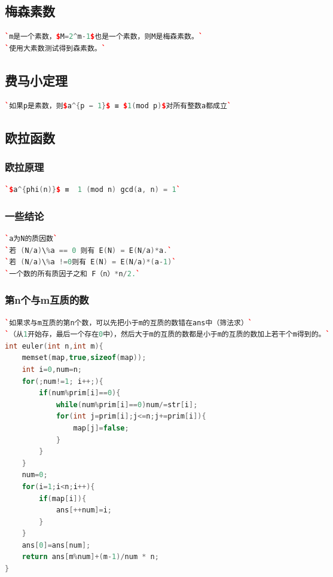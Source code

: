 \documentclass[a4paper]{article}
\begin{document}
\begin{CJK*}{UTF8}{gbsn}
\begin{multicols}{3}
\begin{flushleft}
\subsection{梅森素数}
\begin{lstlisting}[language={c++}]
`m是一个素数，$M=2^m-1$也是一个素数，则M是梅森素数。`
`使用大素数测试得到森素数。`
\end{lstlisting}



\subsection{费马小定理}
\begin{lstlisting}[language={c++}]
`如果p是素数，则$a^{p − 1}$ ≡ $1(mod p)$对所有整数a都成立`
\end{lstlisting}



\subsection{欧拉函数}

\subsubsection{欧拉原理}
\begin{lstlisting}[language={c++}]
`$a^{phi(n)}$ ≡  1 (mod n) gcd(a, n) = 1`
\end{lstlisting}

\subsubsection{一些结论}
\begin{lstlisting}[language={c++}]
`a为N的质因数`
`若 (N/a)\%a == 0 则有 E(N) = E(N/a)*a.`
`若 (N/a)\%a !=0则有 E(N) = E(N/a)*(a-1)`
`一个数的所有质因子之和 F（n）*n/2.`
\end{lstlisting}


\subsubsection{第n个与m互质的数}
\begin{lstlisting}[language={c++}]
`如果求与m互质的第n个数，可以先把小于m的互质的数错在ans中（筛法求）`
`（从1开始存，最后一个存在0中），然后大于m的互质的数都是小于m的互质的数加上若干个m得到的。`
int euler(int n,int m){
    memset(map,true,sizeof(map));
    int i=0,num=n;
    for(;num!=1; i++;){
        if(num%prim[i]==0){
            while(num%prim[i]==0)num/=str[i];
            for(int j=prim[i];j<=n;j+=prim[i]){
                map[j]=false;
            }
        }
    }
    num=0;
    for(i=1;i<n;i++){
        if(map[i]){
            ans[++num]=i;
        }
    }
    ans[0]=ans[num];
    return ans[m%num]+(m-1)/num * n;
}
\end{lstlisting}


\end{flushleft}
\end{multicols}
\end{CJK*}
\end{document}
